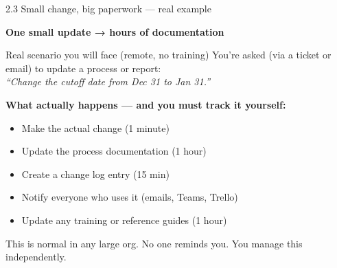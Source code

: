 \documentclass[aspectratio=169, 11pt]{beamer}
\begin{document}
	\begin{frame}{2.3 Small change, big paperwork — real example}
		\begin{center}
			\Large{\textbf{One small update → hours of documentation}}
		\end{center}
		\vspace{0.2cm}
		\begin{block}{Real scenario you will face (remote, no training)}
			You're asked (via a ticket or email) to update a process or report: \\
			\textit{``Change the cutoff date from Dec 31 to Jan 31.''}
		\end{block}
		\vspace{0.1cm}
		\textbf{What actually happens — and you must track it yourself:}
		\begin{itemize}
			\item Make the actual change (1 minute)
			\item Update the process documentation (1 hour)
			\item Create a change log entry (15 min)
			\item Notify everyone who uses it (emails, Teams, Trello)
			\item Update any training or reference guides (1 hour)
		\end{itemize}
		\alert{This is normal in any large org. No one reminds you. You manage this independently.}
	\end{frame}
	
\end{document}
